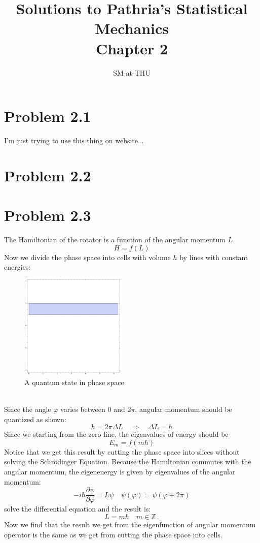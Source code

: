 \documentclass{article}
\author{SM-at-THU}
\title{\bf{Solutions to Pathria's Statistical Mechanics}\\Chapter 2}
\begin{document}
\maketitle
\section*{Problem 2.1}
I'm just trying to use this thing on website...

\section*{Problem 2.2}

\section*{Problem 2.3}
The Hamiltonian of the rotator is a function of the angular momentum $L$. 
$$
H = f(L)
$$
Now we divide the phase space into cells with volume $h$ by lines with constant energies:
\begin{figure}[!htp]
\centering
\includegraphics[width=5cm]{./figures/2.3-2.5/pic2.pdf}
\caption{A quantum state in phase space}
\end{figure}\\
Since the angle $\varphi$ varies between $0$ and $2\pi$, angular momentum should be quantized as shown:
$$
h = 2\pi\Delta L\quad \Rightarrow \quad \Delta L =\hbar
$$
Since we starting from the zero line, the eigenvalues of energy should be
\begin{equation}
E_m = f(m\hbar)
\end{equation}
Notice that we get this result by cutting the phase space into slices without solving the Schr$\ddot{\mathrm{o}}$dinger Equation. Because the Hamiltonian commutes with the angular momentum, the eigenenergy is given by eigenvalues of the angular momentum:
$$
-i\hbar \frac{\partial \psi}{\partial\varphi} = L\psi\quad\psi(\varphi) =\psi(\varphi+2\pi)
$$
solve the differential equation and the result is:
$$
L = m\hbar\quad m \in \mathbb{Z}\,.
$$
Now we find that the result we get from the eigenfunction of angular momentum operator is the same as we get from cutting the phase space into cells.
\end{document}
